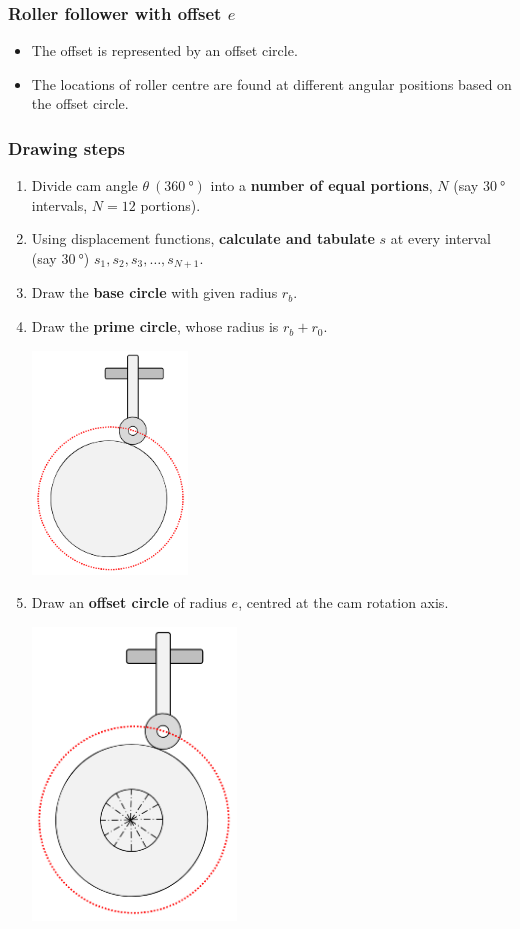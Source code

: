 \documentclass[11pt]{article}
\begin{document}
\subsubsection{Roller follower with offset \(e\)}
\label{sec:orgb7d933a}
\begin{itemize}
\item The offset is represented by an offset circle.
\item The locations of roller centre are found at different angular positions based on the offset circle.
\end{itemize}
\subsubsection{Drawing steps}
\label{sec:org234443f}
\begin{enumerate}
\item Divide cam angle \(\theta \ (\qty{360}{\degree})\) into a \textbf{number of equal portions}, \(N\) (say \(\qty{30}{\degree}\) intervals, \(N = 12\) portions).
\item Using displacement functions, \textbf{calculate and tabulate} \(s\) at every interval (say \(\qty{30}{\degree}\)) \(s_1, s_2, s_3, \ldots, s_{N + 1}\).
\item Draw the \textbf{base circle} with given radius \(r_b\).
\item Draw the \textbf{prime circle}, whose radius is \(r_b + r_0\).
\begin{center}
\includegraphics[height=16em]{./images/roller-follower-with-offset-prime-circle.png}
\end{center}
\item Draw an \textbf{offset circle} of radius \(e\), centred at the cam rotation axis.
\begin{center}
\includegraphics[height=21em]{./images/roller-follower-with-offset-offset-circle.png}

\end{center}
\end{enumerate}
\end{document}
